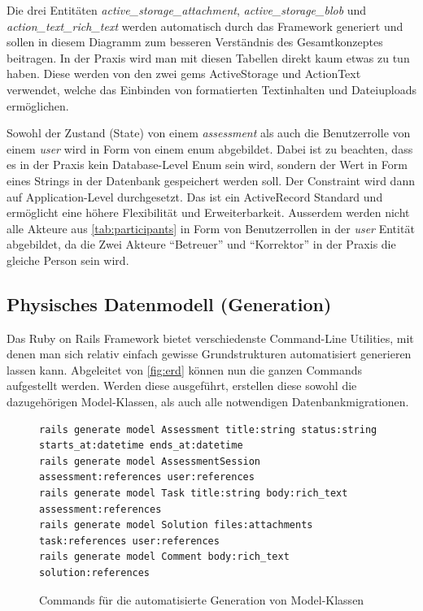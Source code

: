 \newpage

Die drei Entitäten \emph{active\_storage\_attachment}, \emph{active\_storage\_blob} und \emph{action\_text\_rich\_text} werden automatisch durch das
Framework generiert und sollen in diesem Diagramm zum besseren Verständnis des Gesamtkonzeptes beitragen. In der Praxis wird man mit diesen Tabellen direkt kaum etwas zu tun haben.
Diese werden von den zwei gems ActiveStorage und ActionText verwendet, welche das Einbinden von formatierten Textinhalten und Dateiuploads ermöglichen.

Sowohl der Zustand (State) von einem \emph{assessment} als auch die Benutzerrolle von einem \emph{user} wird in Form von einem \gls{enum} abgebildet. Dabei ist zu beachten, dass es in der Praxis kein Database-Level Enum sein wird,
sondern der Wert in Form eines Strings in der Datenbank gespeichert werden soll. Der Constraint wird dann auf Application-Level durchgesetzt. Das ist ein ActiveRecord Standard und ermöglicht eine höhere Flexibilität und Erweiterbarkeit.
Ausserdem werden nicht alle Akteure aus \ref{tab:participants} in Form von Benutzerrollen in der \emph{user} Entität abgebildet, da die Zwei Akteure \enquote{Betreuer} und \enquote{Korrektor} in der Praxis die gleiche Person sein wird.

\subsection{Physisches Datenmodell (Generation)} \label{subsec:model-generation}

Das Ruby on Rails Framework bietet verschiedenste Command-Line Utilities, mit denen man sich relativ einfach gewisse
Grundstrukturen automatisiert generieren lassen kann. Abgeleitet von \ref{fig:erd} können nun die ganzen Commands aufgestellt werden.
Werden diese ausgeführt, erstellen diese sowohl die dazugehörigen Model-Klassen, als auch alle notwendigen Datenbankmigrationen.

\begin{figure}[H]
\begin{codebox}
\begin{verbatim}
rails generate model Assessment title:string status:string starts_at:datetime ends_at:datetime
rails generate model AssessmentSession assessment:references user:references
rails generate model Task title:string body:rich_text assessment:references
rails generate model Solution files:attachments task:references user:references
rails generate model Comment body:rich_text solution:references
\end{verbatim}
\end{codebox}
\caption{\label{fig:generate-models}Commands für die automatisierte Generation von Model-Klassen}
\end{figure}

